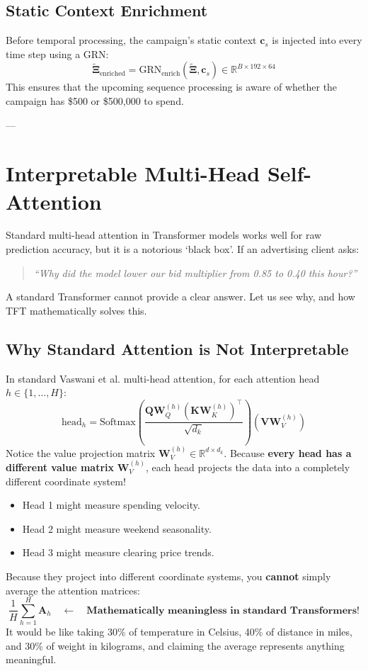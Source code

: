 \documentclass[11pt,a4paper]{article}
\begin{document}
\subsection{Static Context Enrichment}
Before temporal processing, the campaign's static context $\mathbf{c}_s$ is injected into every time step using a GRN:
\begin{equation}
    \tilde{\boldsymbol{\Xi}}_{\text{enriched}} = \mathrm{GRN}_{\text{enrich}}\left(\tilde{\boldsymbol{\Xi}}, \mathbf{c}_s\right) \in \mathbb{R}^{B \times 192 \times 64}
\end{equation}
This ensures that the upcoming sequence processing is aware of whether the campaign has \$500 or \$500,000 to spend.

---

\section{Interpretable Multi-Head Self-Attention}

Standard multi-head attention in Transformer models works well for raw prediction accuracy, but it is a notorious `black box'. If an advertising client asks:
\begin{quote}
\textit{``Why did the model lower our bid multiplier from 0.85 to 0.40 this hour?''}
\end{quote}
A standard Transformer cannot provide a clear answer. Let us see why, and how TFT mathematically solves this.

\subsection{Why Standard Attention is Not Interpretable}
In standard Vaswani et al. multi-head attention, for each attention head $h \in \{1, \dots, H\}$:
\begin{equation}
    \text{head}_h = \mathrm{Softmax}\left(\frac{\mathbf{Q} \mathbf{W}_Q^{(h)} (\mathbf{K} \mathbf{W}_K^{(h)})^\top}{\sqrt{d_k}}\right) \left(\mathbf{V} \mathbf{W}_V^{(h)}\right)
\end{equation}
Notice the value projection matrix $\mathbf{W}_V^{(h)} \in \mathbb{R}^{d \times d_k}$. Because \textbf{every head has a different value matrix} $\mathbf{W}_V^{(h)}$, each head projects the data into a completely different coordinate system!
\begin{itemize}
    \item Head 1 might measure spending velocity.
    \item Head 2 might measure weekend seasonality.
    \item Head 3 might measure clearing price trends.
\end{itemize}
Because they project into different coordinate systems, you \textbf{cannot} simply average the attention matrices:
\begin{equation}
    \frac{1}{H}\sum_{h=1}^H \mathbf{A}_h \quad \longleftarrow \quad \textbf{Mathematically meaningless in standard Transformers!}
\end{equation}
It would be like taking 30\% of temperature in Celsius, 40\% of distance in miles, and 30\% of weight in kilograms, and claiming the average represents anything meaningful.
\end{document}
